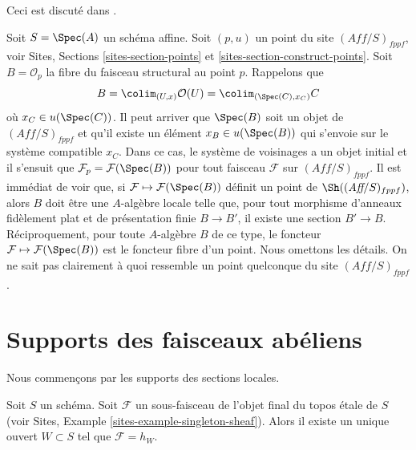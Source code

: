 \begin{remark}
\label{remark-points-fppf-site}
\begin{reference}
Ceci est discut\'e dans \cite{Schroeer}.
\end{reference}
Soit $S = \Spec(A)$ un sch\'ema affine. Soit $(p, u)$ un point du
site $(\textit{Aff}/S)_{fppf}$, voir
Sites, Sections \ref{sites-section-points} et
\ref{sites-section-construct-points}. Soit $B = \mathcal{O}_p$ la fibre
du faisceau structural au point $p$. Rappelons que
$$
B = \colim_{(U, x)} \mathcal{O}(U) =
\colim_{(\Spec(C), x_C)} C
$$
o\`u $x_C \in u(\Spec(C))$. Il peut arriver que
$\Spec(B)$ soit un objet de $(\textit{Aff}/S)_{fppf}$
et qu'il existe un \'el\'ement $x_B \in u(\Spec(B))$ qui s'envoie sur
le syst\`eme compatible $x_C$. Dans ce cas, le syst\`eme de voisinages
a un objet initial et il s'ensuit que
$\mathcal{F}_p = \mathcal{F}(\Spec(B))$ pour tout faisceau $\mathcal{F}$
sur $(\textit{Aff}/S)_{fppf}$. Il est imm\'ediat
de voir que, si $\mathcal{F} \mapsto \mathcal{F}(\Spec(B))$ d\'efinit un point
de $\Sh((\textit{Aff}/S)_{fppf})$, alors
$B$ doit \^etre une $A$-alg\`ebre locale telle que, pour tout morphisme d'anneaux
fid\`element plat et de pr\'esentation finie $B \to B'$, il existe une section $B' \to B$.
R\'eciproquement, pour toute $A$-alg\`ebre $B$ de ce type, le foncteur
$\mathcal{F} \mapsto \mathcal{F}(\Spec(B))$ est le foncteur fibre
d'un point. Nous omettons les d\'etails. On ne sait pas clairement \`a quoi ressemble un point quelconque du
site $(\textit{Aff}/S)_{fppf}$.
\end{remark}











\section{Supports des faisceaux ab\'eliens}
\label{section-support}

\noindent
Nous commen\c{c}ons par les supports des sections locales.

\begin{lemma}
\label{lemma-support-subsheaf-final}
Soit $S$ un sch\'ema. Soit $\mathcal{F}$ un sous-faisceau de l'objet
final du topos \'etale de $S$ (voir
Sites, Example \ref{sites-example-singleton-sheaf}).
Alors il existe un unique ouvert
$W \subset S$ tel que $\mathcal{F} = h_W$.
\end{lemma}

